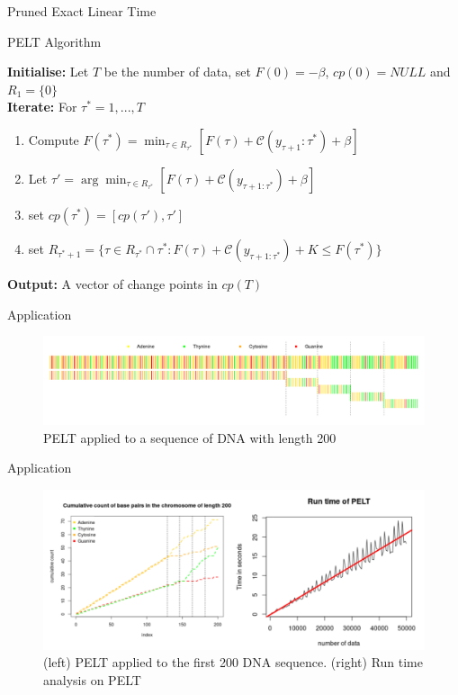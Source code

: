 \documentclass{beamer}
\begin{document}
\begin{frame}{Pruned Exact Linear Time}
\begin{algorithm}[H]
\caption{PELT Algorithm}
\SetAlgoLined
\textbf{Initialise: }Let $T$ be the number of data, set $F(0) = -\beta$, $cp(0) = NULL$ and $R_1 = \{0\}$ \\
\textbf{Iterate:} For $\tau^* = 1,...,T$
\begin{enumerate}
    \item Compute $F(\tau^*) = \min_{\tau \in R_{\tau^*}}[F(\tau) + \mathcal{C}(y_{\tau+1}:\tau^*) + \beta]$ 
    \item Let $\tau' = \arg\min_{\tau \in R_{\tau^*}}[F(\tau) + \mathcal{C}(y_{\tau+1:\tau^*}) + \beta ]$
    \item set $cp(\tau^*) = [cp(\tau'), \tau']$
    \item set $R_{\tau^* + 1} = \{\tau \in R_{\tau^*} \cap {\tau^*}: F(\tau) + \mathcal{C}(y_{\tau+1:\tau^*}) + K \leq F(\tau^*)\}$
\end{enumerate}
\textbf{Output: } A vector of change points in $cp(T)$
\end{algorithm}    
\end{frame}

\begin{frame}{Application}
    \begin{figure}
        \centering
        \includegraphics[scale=0.30]{DNA_seg.png}
        \caption{PELT applied to a sequence of DNA with length 200}
        \label{fig:my_label}
    \end{figure}
\end{frame}

\begin{frame}{Application}
    \begin{figure}
        \centering
        \includegraphics[scale=0.4]{runtime.png}
        \caption{(left) PELT applied to the first 200 DNA sequence. (right) Run time analysis on PELT}
        \label{fig:my_label}
    \end{figure}
\end{frame}
\end{document}
